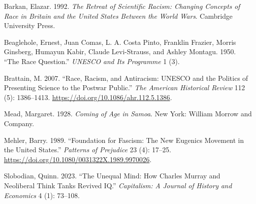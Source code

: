 \documentclass[12pt]{article}
\newlength{\cslhangindent}
\newenvironment{CSLReferences}[2] %
 {%
  \setlength{\parindent}{0pt}
  \ifodd #1 \everypar{\setlength{\hangindent}{\cslhangindent}}\ignorespaces\fi
  \ifnum #2 > 0
  \setlength{\parskip}{#2\baselineskip}
  \fi
 }%
 {}
\begin{document}
\hypertarget{refs}{}
\begin{CSLReferences}{1}{0}
\leavevmode{}%
Barkan, Elazar. 1992. \emph{The {Retreat} of {Scientific Racism}:
{Changing Concepts} of {Race} in {Britain} and the {United States
Between} the {World Wars}}. {Cambridge University Press}.

\leavevmode{}%
Beaglehole, Ernest, Juan Comas, L. A. Costa Pinto, Franklin Frazier,
Morris Ginsberg, Humayun Kabir, Claude Levi-Strauss, and Ashley Montagu.
1950. {``The {Race Question}.''} \emph{UNESCO and Its Programme} 1 (3).

\leavevmode{}%
Brattain, M. 2007. {``Race, {Racism}, and {Antiracism}: {UNESCO} and the
{Politics} of {Presenting Science} to the {Postwar Public}.''} \emph{The
American Historical Review} 112 (5): 1386--1413.
\url{https://doi.org/10.1086/ahr.112.5.1386}.

\leavevmode{}%
Mead, Margaret. 1928. \emph{Coming of {Age} in {Samoa}}. {New York}:
{William Morrow and Company}.

\leavevmode{}%
Mehler, Barry. 1989. {``Foundation for Fascism: {The} New Eugenics
Movement in the {United States}.''} \emph{Patterns of Prejudice} 23 (4):
17--25. \url{https://doi.org/10.1080/0031322X.1989.9970026}.

\leavevmode{}%
Slobodian, Quinn. 2023. {``The {Unequal Mind}: {How Charles Murray} and
{Neoliberal Think Tanks Revived IQ}.''} \emph{Capitalism: A Journal of
History and Economics} 4 (1): 73--108.

\end{CSLReferences}
\end{document}
